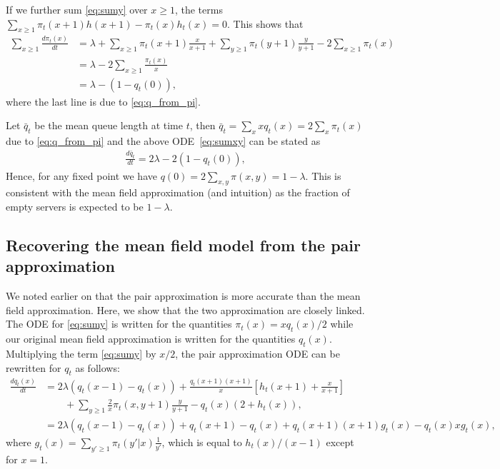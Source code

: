 \documentclass[acmsmall,nonacm]{acmart}
\begin{document}
If we further sum \eqref{eq:sumy} over $x\ge1$, the terms $\sum_{x\ge1}\pi_t(x+1)h(x+1)-\pi_t(x)h_t(x)=0$. This shows that
\begin{align}\label{eq:sumxy}
    \sum_{x\ge1} \frac{d \pi_t(x)}{dt} &= \lambda  + \sum_{x\ge1} \pi_t(x+1)  \frac{x}{x+1} + \sum_{y\ge1} \pi_t(y+1)\frac{y}{y+1} - 2\sum_{x\ge1} \pi_t(x) \\
    &= \lambda - 2 \sum_{x\ge1} \frac{\pi_t(x)}{x}\nonumber\\
    &= \lambda - (1-q_t(0)),
\end{align}
where the last line is due to \eqref{eq:q_from_pi}. 

Let $\bar q_t$ be the mean queue length at time $t$, then $\bar q_t = \sum_x x q_t(x) = 2\sum_{x}\pi_t(x)$ due to \eqref{eq:q_from_pi} and the above ODE~\eqref{eq:sumxy} can be stated as
\begin{align}\label{eq:ODEbarqt}
     \frac{d \bar q_t}{dt}  = 2\lambda - 2(1-q_t(0)),
\end{align}
Hence, for any fixed point we have $q(0)=2\sum_{x,y} \pi(x,y) = 1-\lambda$. This is consistent with the mean field approximation (and intuition) as the fraction of empty servers is expected to be $1-\lambda$.

\subsection{Recovering the mean field model from the pair approximation}

We noted earlier on that the pair approximation is more accurate than the mean field approximation.  Here, we show that the two approximation are closely linked. The ODE for \eqref{eq:sumy} is written for the quantities $\pi_t(x)=x q_t(x)/2$ while our original mean field approximation is written for the quantities $q_t(x)$. Multiplying the term \eqref{eq:sumy} by $x/2$, the pair approximation ODE can be rewritten for $q_t$ as follows:
\begin{align*}%
    \frac{d q_t(x)}{dt} &= 2\lambda (q_t(x-1)-q_t(x)) + \frac{q_t(x+1) (x+1)}{x}\left[h_t(x+1)+\frac{x}{x+1}\right] \nonumber\\
    &\qquad+ \sum_{y\ge1} \frac2x \pi_t(x,y+1)\frac{y}{y+1} - q_t(x)(2+h_t(x)),\\
    &= 2\lambda (q_t(x-1)-q_t(x)) + q_t(x+1)-q_t(x) + q_t(x+1)(x+1)g_t(x) - q_t(x)x g_t(x),
\end{align*}
where $g_t(x)=\sum_{y' \geq 1} \pi_t(y'|x) \frac{1}{y'}$, which is equal to $h_t(x)/(x-1)$ except for $x=1$.
\end{document}
